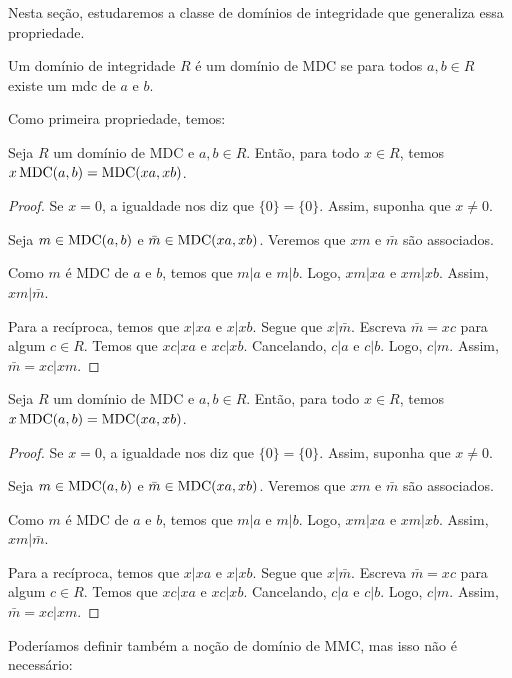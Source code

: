 Nesta seção, estudaremos a classe de domínios de integridade que generaliza essa propriedade.

\begin{definition}
    Um domínio de integridade $R$ é um domínio de MDC se para todos $a, b \in R$ existe um mdc de $a$ e $b$.
\end{definition}

Como primeira propriedade, temos:

\begin{prop}
    Seja $R$ um domínio de MDC e $a, b\in R$.
    Então, para todo $x \in R$, temos $x\operatorname{MDC}(a, b)=\operatorname{MDC}(xa, xb)$.
\end{prop}
\begin{proof}
    Se $x=0$, a igualdade nos diz que $\{0\}=\{0\}$.
    Assim, suponha que $x\neq 0$.

    Seja $m\in \operatorname{MDC}(a, b)$ e $\bar m \in \operatorname{MDC}(xa, xb)$.
    Veremos que $xm$ e $\bar m$ são associados.

    Como $m$ é MDC de $a$ e $b$, temos que $m|a$ e $m|b$.
    Logo, $xm|xa$ e $xm|xb$.
    Assim, $xm|\bar m$.

    Para a recíproca, temos que $x|xa$ e $x|xb$. Segue que $x|\bar m$.
    Escreva $\bar m=xc$ para algum $c \in R$.
    Temos que $xc|xa$ e $xc|xb$.
    Cancelando, $c|a$ e $c|b$.
    Logo, $c|m$. Assim, $\bar m=xc|xm$.
\end{proof}

\begin{prop}
    Seja $R$ um domínio de MDC e $a, b\in R$.
    Então, para todo $x \in R$, temos $x\operatorname{MDC}(a, b)=\operatorname{MDC}(xa, xb)$.
\end{prop}
\begin{proof}
    Se $x=0$, a igualdade nos diz que $\{0\}=\{0\}$.
    Assim, suponha que $x\neq 0$.

    Seja $m\in \operatorname{MDC}(a, b)$ e $\bar m \in \operatorname{MDC}(xa, xb)$.
    Veremos que $xm$ e $\bar m$ são associados.

    Como $m$ é MDC de $a$ e $b$, temos que $m|a$ e $m|b$.
    Logo, $xm|xa$ e $xm|xb$.
    Assim, $xm|\bar m$.

    Para a recíproca, temos que $x|xa$ e $x|xb$. Segue que $x|\bar m$.
    Escreva $\bar m=xc$ para algum $c \in R$.
    Temos que $xc|xa$ e $xc|xb$.
    Cancelando, $c|a$ e $c|b$.
    Logo, $c|m$. Assim, $\bar m=xc|xm$.
\end{proof}


Poderíamos definir também a noção de domínio de MMC, mas isso não é necessário:


